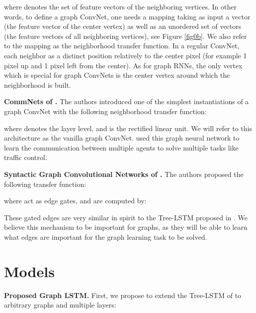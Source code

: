 \documentclass{article} \usepackage{iclr2018_conference,times}
\begin{document}
where  denotes the set of feature vectors of the neighboring vertices. In other words, to define a graph ConvNet, one needs a mapping  taking as input  a vector   (the feature vector of the center vertex) as well as an unordered set of vectors  (the feature vectors of all neighboring vertices), see Figure \ref{fig0b}. We also refer to the mapping  as the neighborhood transfer function.   In a regular ConvNet, each neighbor as a distinct position relatively to the center pixel (for example 1 pixel up and 1 pixel left from the center). As for graph RNNs, the only vertex which is special for graph ConvNets is the center vertex around which the neighborhood is built.





{\bf CommNets of \cite{art:SukhbaatarSzlamFergus16ComAgents}.} The authors introduced one of the simplest instantiations of a graph ConvNet with the following neighborhood transfer function:

where  denotes the layer level, and  is the rectified linear unit. We will refer to this architecture as the vanilla graph ConvNet. \cite{art:SukhbaatarSzlamFergus16ComAgents} used this graph neural network to learn the communication between multiple agents to solve multiple tasks like traffic control.



{\bf Syntactic Graph Convolutional Networks of \cite{marcheggiani2017encoding}.} The authors proposed the following transfer function:

where  act as edge gates, and are computed by:

These gated edges are very similar in spirit to the Tree-LSTM proposed in \cite{art:TaiSocherManning15TreeLSTM}. We believe this mechanism to be important for graphs, as they will be able to learn what edges are important for the graph learning task to be solved. 








\section{Models}
\label{sec_our_models}


{\bf Proposed Graph LSTM. } First, we propose to extend the Tree-LSTM of \cite{art:TaiSocherManning15TreeLSTM} to arbitrary graphs and multiple layers:
\end{document}
